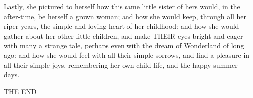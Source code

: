 \documentclass[12pt]{book}
\begin{document}
\begin{Parallel}[p]{}{}
{Lastly, she pictured to herself how this same little sister of hers would, in the after-time, be herself a grown woman; and how she would keep, through all her riper years, the simple and loving heart of her childhood: and how she would gather about her other little children, and make THEIR eyes bright and eager with many a strange tale, perhaps even with the dream of Wonderland of long ago: and how she would feel with all their simple sorrows, and find a pleasure in all their simple joys, remembering her own child-life, and the happy summer days.

\quad\quad\quad\quad THE END
}  %


\end{Parallel}
\end{document}
